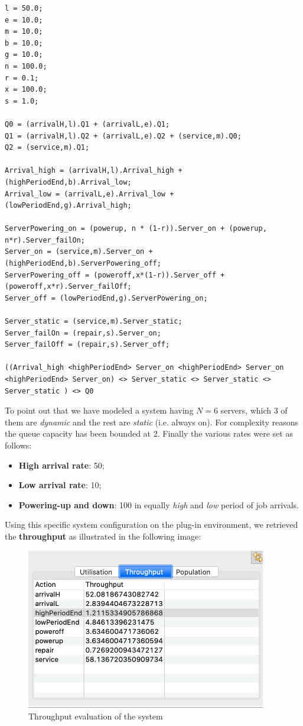 \documentclass{article}
\begin{document}
\begin{lstlisting}[caption=PEPA Eclipse Plug-In of the System]
l = 50.0;
e = 10.0;
m = 10.0;
b = 10.0;
g = 10.0;
n = 100.0;
r = 0.1;
x = 100.0;
s = 1.0;

Q0 = (arrivalH,l).Q1 + (arrivalL,e).Q1;
Q1 = (arrivalH,l).Q2 + (arrivalL,e).Q2 + (service,m).Q0;
Q2 = (service,m).Q1;

Arrival_high = (arrivalH,l).Arrival_high + (highPeriodEnd,b).Arrival_low;
Arrival_low = (arrivalL,e).Arrival_low + (lowPeriodEnd,g).Arrival_high; 

ServerPowering_on = (powerup, n * (1-r)).Server_on + (powerup, n*r).Server_failOn;
Server_on = (service,m).Server_on + (highPeriodEnd,b).ServerPowering_off;
ServerPowering_off = (poweroff,x*(1-r)).Server_off + (poweroff,x*r).Server_failOff;
Server_off = (lowPeriodEnd,g).ServerPowering_on;

Server_static = (service,m).Server_static;
Server_failOn = (repair,s).Server_on;
Server_failOff = (repair,s).Server_off;

((Arrival_high <highPeriodEnd> Server_on <highPeriodEnd> Server_on <highPeriodEnd> Server_on) <> Server_static <> Server_static <> Server_static ) <> Q0
\end{lstlisting}

\noindent To point out that we have modeled a system having \(N = 6\) servers, which 3 of them are \textit{dynamic} and the rest are \textit{static} (i.e. always on).\newline
For complexity reasons the queue capacity has been bounded at 2.\newline
Finally the various rates were set as follows:

\begin{itemize}
    \item \textbf{High arrival rate}: 50;
    \item \textbf{Low arrival rate}: 10;
    \item \textbf{Powering-up and down}: 100 in equally \textit{high} and \textit{low} period of job arrivals.
\end{itemize}

\noindent Using this specific system configuration on the plug-in environment, we retrieved the \textbf{throughput} as illustrated in the following image:

\begin{figure}[H]
    \centering
    \includegraphics[width=10.5cm]{throughput-table.png}
    \caption{Throughput evaluation of the system}
    \label{fig:throughput-table}
\end{figure}
\end{document}
